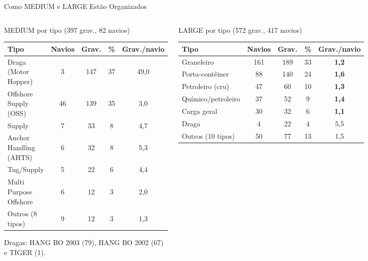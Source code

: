 \documentclass[aspectratio=169]{beamer}
\newcommand{\cahi}[1]{\cellcolor{green!30}\textbf{#1}}
\newcommand{\calo}[1]{\cellcolor{red!20}#1}
\begin{document}
\begin{frame}{Como MEDIUM e LARGE Estão Organizados}
    \footnotesize
    \begin{columns}[t]
        \begin{block}{\small MEDIUM por tipo (397 grav., 82 navios)}
            \tiny
            \centering
            \setlength{\tabcolsep}{2.5pt}
            \begin{tabular}{lcccc}
            \toprule
            Tipo & Navios & Grav. & \% & Grav./navio \\
            \midrule
            Draga (Motor Hopper) & 3 & 147 & \calo{37} & \calo{49,0} \\
            Offshore Supply (OSS) & 46 & 139 & 35 & 3,0 \\
            Supply & 7 & 33 & 8 & 4,7 \\
            Anchor Handling (AHTS) & 6 & 32 & 8 & 5,3 \\
            Tug/Supply & 5 & 22 & 6 & 4,4 \\
            Multi Purpose Offshore & 6 & 12 & 3 & 2,0 \\
            Outros (8 tipos) & 9 & 12 & 3 & 1,3 \\
            \bottomrule
            \end{tabular}

            \vspace{0.05cm}
            {\tiny Dragas: HANG BO 2003 (79), HANG BO 2002 (67) e TIGER (1).\par}
        \end{block}
        \begin{block}{\small LARGE por tipo (572 grav., 417 navios)}
            \tiny
            \centering
            \setlength{\tabcolsep}{2.5pt}
            \begin{tabular}{lcccc}
            \toprule
            Tipo & Navios & Grav. & \% & Grav./navio \\
            \midrule
            Graneleiro & 161 & 189 & 33 & \cahi{1,2} \\
            Porta-contêiner & 88 & 140 & 24 & \cahi{1,6} \\
            Petroleiro (cru) & 47 & 60 & 10 & \cahi{1,3} \\
            Químico/petroleiro & 37 & 52 & 9 & \cahi{1,4} \\
            Carga geral & 30 & 32 & 6 & \cahi{1,1} \\
            Draga & 4 & 22 & 4 & 5,5 \\
            Outros (10 tipos) & 50 & 77 & 13 & 1,5 \\
            \bottomrule
            \end{tabular}


\end{block}
\end{columns}
\end{frame}
\end{document}
